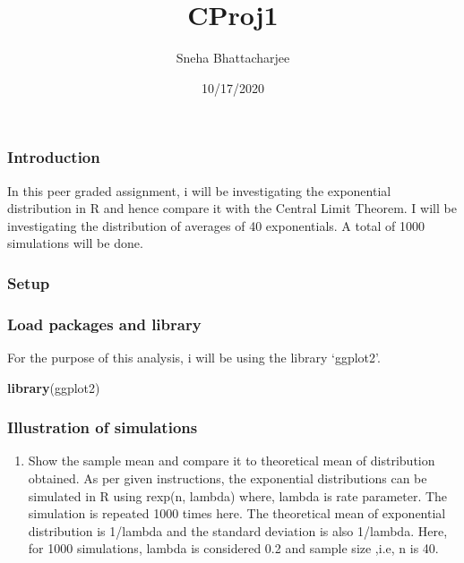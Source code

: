 \documentclass[
]{article}
\title{CProj1}
\author{Sneha Bhattacharjee}
\date{10/17/2020}
\newenvironment{Shaded}{\begin{snugshade}}{\end{snugshade}}
\newcommand{\KeywordTok}[1]{\textcolor[rgb]{0.13,0.29,0.53}{\textbf{#1}}}
\newcommand{\NormalTok}[1]{#1}
\providecommand{\tightlist}{%
  \setlength{\itemsep}{0pt}\setlength{\parskip}{0pt}}
\begin{document}
\maketitle

\hypertarget{introduction}{%
\subsubsection{Introduction}\label{introduction}}

In this peer graded assignment, i will be investigating the exponential
distribution in R and hence compare it with the Central Limit Theorem. I
will be investigating the distribution of averages of 40 exponentials. A
total of 1000 simulations will be done.

\hypertarget{setup}{%
\subsubsection{Setup}\label{setup}}

\hypertarget{load-packages-and-library}{%
\subsubsection{Load packages and
library}\label{load-packages-and-library}}

For the purpose of this analysis, i will be using the library `ggplot2'.

\begin{Shaded}
\begin{Highlighting}[]
\KeywordTok{library}\NormalTok{(ggplot2)}
\end{Highlighting}
\end{Shaded}

\hypertarget{illustration-of-simulations}{%
\subsubsection{Illustration of
simulations}\label{illustration-of-simulations}}

\begin{enumerate}
\def\labelenumi{\arabic{enumi}.}
\tightlist
\item
  Show the sample mean and compare it to theoretical mean of
  distribution obtained. As per given instructions, the exponential
  distributions can be simulated in R using rexp(n, lambda) where,
  lambda is rate parameter. The simulation is repeated 1000 times here.
  The theoretical mean of exponential distribution is 1/lambda and the
  standard deviation is also 1/lambda. Here, for 1000 simulations,
  lambda is considered 0.2 and sample size ,i.e, n is 40.
\end{enumerate}
\end{document}
